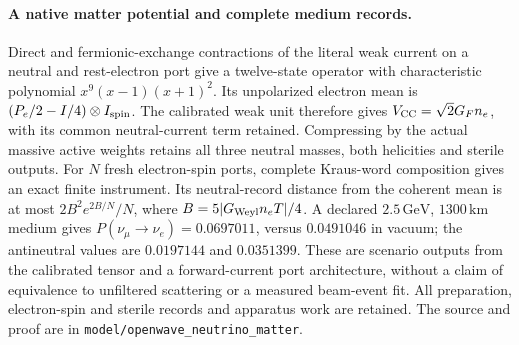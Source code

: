 \paragraph{A native matter potential and complete medium records.}
Direct and fermionic-exchange contractions of the literal weak current
on a neutral and rest-electron port give a twelve-state operator with
characteristic polynomial \(x^9(x-1)(x+1)^2\). Its unpolarized electron
mean is \((P_e/2-I/4)\otimes I_{\rm spin}\). The calibrated weak unit
therefore gives \(V_{\rm CC}=\sqrt2G_F n_e\), with its common neutral-current
term retained. Compressing by the actual massive active weights retains
all three neutral masses, both helicities and sterile outputs.
For \(N\) fresh electron-spin ports, complete Kraus-word composition gives
an exact finite instrument. Its neutral-record distance from the coherent
mean is at most \(2B^2e^{2B/N}/N\), where
\(B=5|G_{\rm Weyl}n_eT|/4\).
A declared \(2.5\,\mathrm{GeV}\), \(1300\,\mathrm{km}\) medium gives
\(P(\nu_\mu\to\nu_e)=0.0697011\), versus \(0.0491046\) in vacuum;
the antineutral values are \(0.0197144\) and \(0.0351399\).
These are scenario outputs from the calibrated tensor and a forward-current
port architecture, without a claim of equivalence to unfiltered scattering
or a measured beam-event fit. All preparation, electron-spin and sterile
records and apparatus work are retained. The source and proof are in
\texttt{model/openwave\_neutrino\_matter}.
